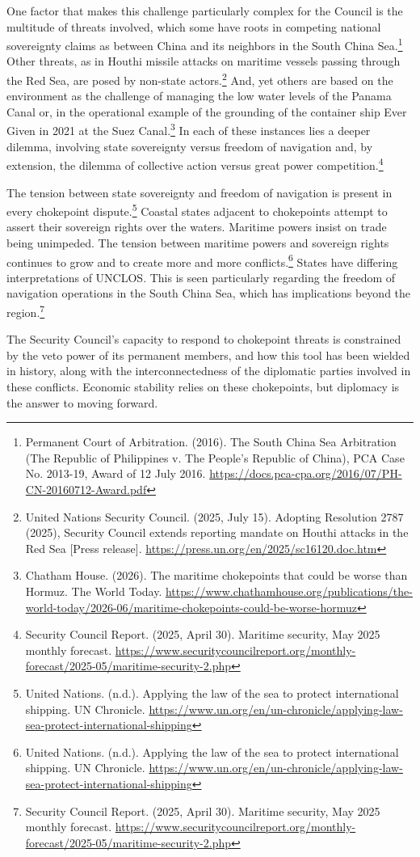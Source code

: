 One factor that makes this challenge particularly complex for the Council is the multitude of threats involved, which some have roots in competing national sovereignty claims as between China and its neighbors in the South China Sea.\footnote{Permanent Court of Arbitration. (2016). The South China Sea Arbitration (The Republic of Philippines v. The People's Republic of China), PCA Case No. 2013-19, Award of 12 July 2016. \url{https://docs.pca-cpa.org/2016/07/PH-CN-20160712-Award.pdf}} Other threats, as in Houthi missile attacks on maritime vessels passing through the Red Sea, are posed by non-state actors.\footnote{United Nations Security Council. (2025, July 15). Adopting Resolution 2787 (2025), Security Council extends reporting mandate on Houthi attacks in the Red Sea [Press release]. \url{https://press.un.org/en/2025/sc16120.doc.htm}} And, yet others are based on the environment as the challenge of managing the low water levels of the Panama Canal or, in the operational example of the grounding of the container ship Ever Given in 2021 at the Suez Canal.\footnote{Chatham House. (2026). The maritime chokepoints that could be worse than Hormuz. The World Today. \url{https://www.chathamhouse.org/publications/the-world-today/2026-06/maritime-chokepoints-could-be-worse-hormuz}} In each of these instances lies a deeper dilemma, involving state sovereignty versus freedom of navigation and, by extension, the dilemma of collective action versus great power competition.\footnote{Security Council Report. (2025, April 30). Maritime security, May 2025 monthly forecast. \url{https://www.securitycouncilreport.org/monthly-forecast/2025-05/maritime-security-2.php}}

The tension between state sovereignty and freedom of navigation is present in every chokepoint dispute.\footnote{United Nations. (n.d.). Applying the law of the sea to protect international shipping. UN Chronicle. \url{https://www.un.org/en/un-chronicle/applying-law-sea-protect-international-shipping}} Coastal states adjacent to chokepoints attempt to assert their sovereign rights over the waters. Maritime powers insist on trade being unimpeded. The tension between maritime powers and sovereign rights continues to grow and to create more and more conflicts.\footnote{United Nations. (n.d.). Applying the law of the sea to protect international shipping. UN Chronicle. \url{https://www.un.org/en/un-chronicle/applying-law-sea-protect-international-shipping}} States have differing interpretations of UNCLOS. This is seen particularly regarding the freedom of navigation operations in the South China Sea, which has implications beyond the region.\footnote{Security Council Report. (2025, April 30). Maritime security, May 2025 monthly forecast. \url{https://www.securitycouncilreport.org/monthly-forecast/2025-05/maritime-security-2.php}}

The Security Council’s capacity to respond to chokepoint threats is constrained by the veto power of its permanent members, and how this tool has been wielded in history, along with the interconnectedness of the diplomatic parties involved in these conflicts. Economic stability relies on these chokepoints, but diplomacy is the answer to moving forward.
